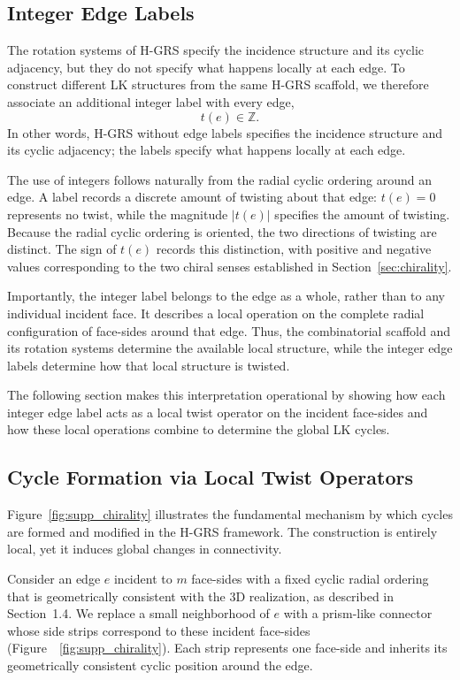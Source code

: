 \documentclass[acmtog]{acmart}
\begin{document}
\subsection{Integer Edge Labels}
\label{sec:integer-labels}

The rotation systems of H-GRS specify the incidence structure and its cyclic
adjacency, but they do not specify what happens locally at each edge. To
construct different LK structures from the same H-GRS scaffold, we therefore
associate an additional integer label with every edge,
\[
t(e)\in\mathbb{Z}.
\]
In other words, H-GRS without edge labels specifies the incidence structure
and its cyclic adjacency; the labels specify what happens locally at each
edge.

The use of integers follows naturally from the radial cyclic ordering around
an edge. A label records a discrete amount of twisting about that edge:
$t(e)=0$ represents no twist, while the magnitude $|t(e)|$ specifies the
amount of twisting. Because the radial cyclic ordering is oriented, the two
directions of twisting are distinct. The sign of $t(e)$ records this
distinction, with positive and negative values corresponding to the two
chiral senses established in Section~\ref{sec:chirality}.

Importantly, the integer label belongs to the edge as a whole, rather than to
any individual incident face. It describes a local operation on the complete
radial configuration of face-sides around that edge. Thus, the combinatorial
scaffold and its rotation systems determine the available local structure,
while the integer edge labels determine how that local structure is twisted.

The following section makes this interpretation operational by showing
how each integer edge label acts as a local twist operator on the incident
face-sides and how these local operations combine to determine the global LK cycles.

\subsection{Cycle Formation via Local Twist Operators}

Figure~\ref{fig:supp_chirality} illustrates the fundamental mechanism by which cycles are formed and modified in the H-GRS framework. The construction is entirely local, yet it induces global changes in connectivity.

Consider an edge $e$ incident to $m$ face-sides with a fixed cyclic radial ordering that is geometrically consistent with the 3D realization, as described in Section~1.4. We replace a small neighborhood of $e$ with a prism-like connector whose side strips correspond to these incident face-sides (Figure~~\ref{fig:supp_chirality}). Each strip represents one face-side and inherits its geometrically consistent cyclic position around the edge.
\end{document}
